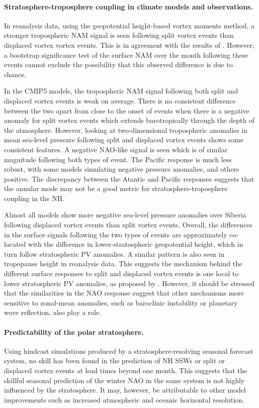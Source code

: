 \paragraph{Stratosphere-troposphere coupling in climate models and
  observations.}  In reanalysis data, using the geopotential height-based vortex
moments method, a stronger tropospheric NAM signal is seen following split
vortex events than displaced vortex vortex events. This is in agreement with the
results of \citet{Mitchell2013}. However, a bootstrap significance test of the
surface NAM over the month following these events cannot exclude the possibility
that this observed difference is due to chance.

In the CMIP5 models, the tropospheric NAM signal following both split and
displaced vortex events is weak on average. There is no consistent difference
between the two apart from close to the onset of events when there is a negative
anomaly for split vortex events which extends barotropically through the depth
of the atmosphere. However, looking at two-dimensional tropospheric anomalies in
mean sea-level pressure following split and displaced vortex events shows some
consistent features. A negative NAO-like signal is seen which is of similar
magnitude following both types of event. The Pacific response is much less
robust, with some models simulating negative pressure anomalies, and others
positive. The discrepancy between the Atantic and Pacific responses suggests
that the annular mode may not be a good metric for stratosphere-troposphere
coupling in the NH.

Almost all models show more negative sea-level pressure anomalies over Siberia
following displaced vortex events than split vortex events. Overall, the
differences in the surface signals following the two types of events are
approximately co-located with the difference in lower-stratospheric geopotential
height, which in turn follow stratospheric PV anomalies. A similar pattern is
also seen in tropopause height in reanalysis data. This suggests the mechanism
behind the different surface responses to split and displaced vortex events is
one local to lower stratospheric PV anomalies, as proposed by
\citet{Ambaum2002}. However, it should be stressed that the similarities in the
NAO response suggest that other mechanisms more sensitive to zonal-mean
anomalies, such as baroclinic instability or planetary wave reflection, also
play a role.

\paragraph{Predictability of the polar stratosphere.} Using hindcast simulations
produced by a stratosphere-resolving seasonal forecast system, no skill has been
found in the prediction of NH SSWs or split or displaced vortex events at lead
times beyond one month. This suggests that the skillful seasonal prediction of
the winter NAO in the same system \citep{Scaife2013} is not highly influenced by
the stratosphere. It may, however, be attributable to other model improvements
such as increased atmospheric and oceanic horizontal resolution.

